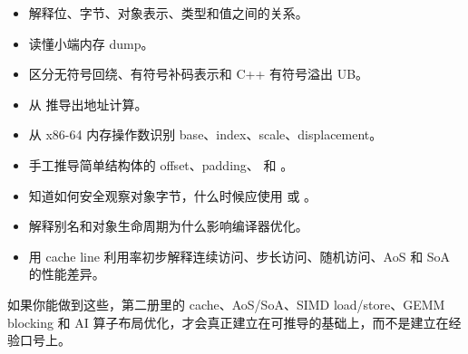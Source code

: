 \begin{itemize}
  \item 解释位、字节、对象表示、类型和值之间的关系。
  \item 读懂小端内存 dump。
  \item 区分无符号回绕、有符号补码表示和 C++ 有符号溢出 UB。
  \item 从  推导出地址计算。
  \item 从 x86-64 内存操作数识别 base、index、scale、displacement。
  \item 手工推导简单结构体的 offset、padding、 和 。
  \item 知道如何安全观察对象字节，什么时候应使用  或 。
  \item 解释别名和对象生命周期为什么影响编译器优化。
  \item 用 cache line 利用率初步解释连续访问、步长访问、随机访问、AoS 和 SoA 的性能差异。
\end{itemize}

如果你能做到这些，第二册里的 cache、AoS/SoA、SIMD load/store、GEMM blocking 和 AI 算子布局优化，才会真正建立在可推导的基础上，而不是建立在经验口号上。
